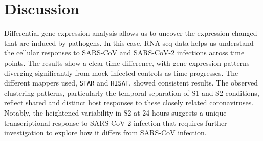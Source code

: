 \documentclass{article}
\begin{document}
    \section{Discussion}\label{sec:discussion}
    Differential gene expression analysis allows us to uncover the expression changed that are induced by pathogens. In this case, RNA-seq data helps us understand the cellular responses to SARS-CoV and SARS-CoV-2 infections across time points. The results show a clear time difference, with gene expression patterns diverging significantly from mock-infected controls as time progresses. The different mappers used, \texttt{STAR} and \texttt{HISAT}, showed consistent results. The observed clustering patterns, particularly the temporal separation of S1 and S2 conditions, reflect shared and distinct host responses to these closely related coronaviruses. Notably, the heightened variability in S2 at 24 hours suggests a unique transcriptional response to SARS-CoV-2 infection that requires further investigation to explore how it differs from SARS-CoV infection.
    \AtNextBibliography{\small}
    \printbibliography
\end{document}
